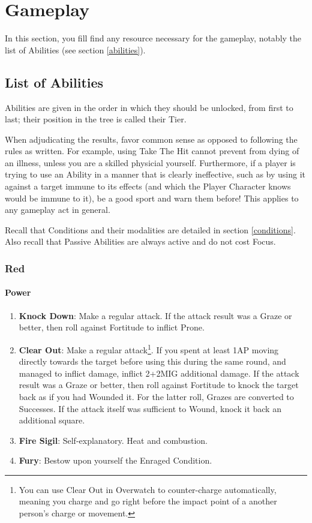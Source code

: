 \chapter{Gameplay}

In this section, you fill find any resource necessary for the gameplay, notably the list of Abilities (see section \ref{abilities}).

\section{List of Abilities}
\label{abilities_list}

Abilities are given in the order in which they should be unlocked, from first to last; their position in the tree is called their Tier. 

When adjudicating the results, favor common sense as opposed to following the rules as written. For example, using Take The Hit cannot prevent from dying of an illness, unless you are a skilled physicial yourself. Furthermore, if a player is trying to use an Ability in a manner that is clearly ineffective, such as by using it against a target immune to its effects (and which the Player Character knows would be immune to it), be a good sport and warn them before! This applies to any gameplay act in general.

Recall that Conditions and their modalities are detailed in section \ref{conditions}. Also recall that Passive Abilities are always active and do not cost Focus.

\subsection{Red}

\subsubsection{Power}
\begin{enumerate}
    \item \textbf{Knock Down}: Make a regular attack. If the attack result was a Graze or better, then roll against Fortitude to inflict Prone.
    \item \textbf{Clear Out}: Make a regular attack\footnote{You can use Clear Out in Overwatch to counter-charge automatically, meaning you charge and go right before the impact point of a another person's charge or movement.}. If you spent at least 1AP moving directly towards the target before using this during the same round, and managed to inflict damage, inflict 2+2\texttimes MIG additional damage. If the attack result was a Graze or better, then roll against Fortitude to knock the target back as if you had Wounded it. For the latter roll, Grazes are converted to Successes. If the attack itself was sufficient to Wound, knock it back an additional square.
    \item \textbf{Fire Sigil}: Self-explanatory. Heat and combustion.
    \item \textbf{Fury}: Bestow upon yourself the Enraged Condition.
\end{enumerate}

